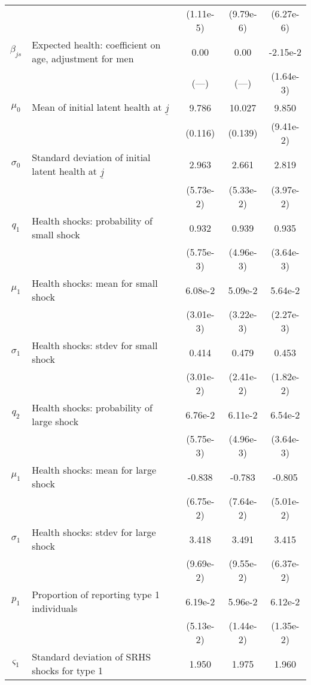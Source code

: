 \begin{table}
\begin{center}
{\begin{tabular}{clccc}
\rule{0pt}{2.2ex} & & (1.11e-5) & (9.79e-6) & (6.27e-6) \\
\rule{0pt}{2.2ex}$\beta_{js}$ & Expected health: coefficient on age, adjustment for men & 0.00 & 0.00 & -2.15e-2 \\
\rule{0pt}{2.2ex} & & (---) & (---) & (1.64e-3) \\
\hline
\rule{0pt}{2.2ex}$\mu_0$ & Mean of initial latent health at $\underline{j}$ & 9.786 & 10.027 & 9.850 \\
\rule{0pt}{2.2ex} & & (0.116) & (0.139) & (9.41e-2) \\
\rule{0pt}{2.2ex}$\sigma_0$ & Standard deviation of initial latent health at $\underline{j}$ & 2.963 & 2.661 & 2.819 \\
\rule{0pt}{2.2ex} & & (5.73e-2) & (5.33e-2) & (3.97e-2) \\
\rule{0pt}{2.2ex}$q_1$ & Health shocks: probability of small shock & 0.932 & 0.939 & 0.935 \\
\rule{0pt}{2.2ex} & & (5.75e-3) & (4.96e-3) & (3.64e-3) \\
\rule{0pt}{2.2ex}$\mu_1$ & Health shocks: mean for small shock & 6.08e-2 & 5.09e-2 & 5.64e-2 \\
\rule{0pt}{2.2ex} & & (3.01e-3) & (3.22e-3) & (2.27e-3) \\
\rule{0pt}{2.2ex}$\sigma_1$ & Health shocks: stdev for small shock & 0.414 & 0.479 & 0.453 \\
\rule{0pt}{2.2ex} & & (3.01e-2) & (2.41e-2) & (1.82e-2) \\
\rule{0pt}{2.2ex}$q_2$ & Health shocks: probability of large shock & 6.76e-2 & 6.11e-2 & 6.54e-2 \\
\rule{0pt}{2.2ex} & & (5.75e-3) & (4.96e-3) & (3.64e-3) \\
\rule{0pt}{2.2ex}$\mu_1$ & Health shocks: mean for large shock & -0.838 & -0.783 & -0.805 \\
\rule{0pt}{2.2ex} & & (6.75e-2) & (7.64e-2) & (5.01e-2) \\
\rule{0pt}{2.2ex}$\sigma_1$ & Health shocks: stdev for large shock & 3.418 & 3.491 & 3.415 \\
\rule{0pt}{2.2ex} & & (9.69e-2) & (9.55e-2) & (6.37e-2) \\
\hline
\rule{0pt}{2.2ex}$p_1$ & Proportion of reporting type 1 individuals & 6.19e-2 & 5.96e-2 & 6.12e-2 \\
\rule{0pt}{2.2ex} & & (5.13e-2) & (1.44e-2) & (1.35e-2) \\
\rule{0pt}{2.2ex}$\varsigma_1$ & Standard deviation of SRHS shocks for type 1 & 1.950 & 1.975 & 1.960 \\

\end{tabular}}
\end{center}
\end{table}
